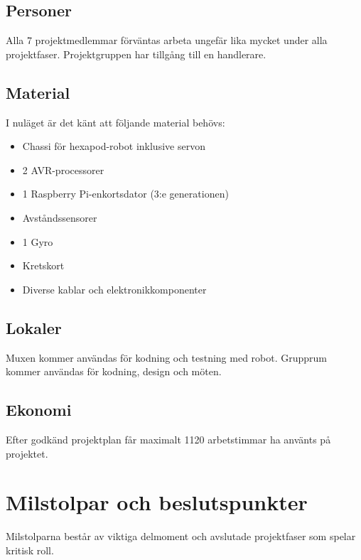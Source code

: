 \documentclass[a4paper,titlepage,12pt]{article}
\begin{document}
	\subsection{Personer}
	Alla 7 projektmedlemmar förväntas arbeta ungefär lika mycket under alla
	projektfaser. Projektgruppen har tillgång till en handlerare.
	
	\subsection{Material}
    I nuläget är det känt att följande material behövs:
	\begin{itemize}
			\item Chassi för hexapod-robot inklusive servon
			\item 2 AVR-processorer
			\item 1 Raspberry Pi-enkortsdator (3:e generationen)
			\item Avståndssensorer
            \item 1 Gyro
            \item Kretskort
            \item Diverse kablar och elektronikkomponenter
	\end{itemize}
	
	
	\subsection{Lokaler}
	Muxen kommer användas för kodning och testning med robot. Grupprum kommer
	användas för kodning, design och möten.
	
	
	\subsection{Ekonomi}
	Efter godkänd projektplan får maximalt 1120 arbetstimmar ha använts på projektet.
	
	
	\section{Milstolpar och beslutspunkter}
	Milstolparna består av viktiga delmoment och avslutade projektfaser som
  spelar kritisk roll. 
	
\end{document}
